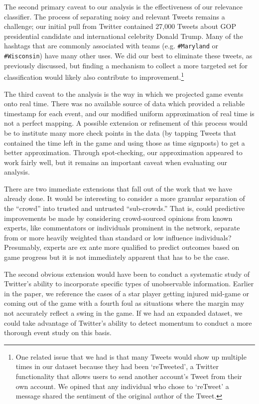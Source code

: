 \documentclass[12pt]{article}
\begin{document}
\begin{doublespacing}
The second primary caveat to our analysis is the effectiveness of our relevance classifier. The process of separating noisy and relevant Tweets remains a challenge; our initial pull from Twitter contained 27,000 Tweets about GOP presidential candidate and international celebrity Donald Trump. Many of the hashtags that are commonly associated with teams (e.g. \texttt{\#Maryland} or \texttt{\#Wisconsin}) have many other uses. We did our best to eliminate these tweets, as previously discussed, but finding a mechanism to collect a more targeted set for classification would likely also contribute to improvement.\footnote{One related issue that we had is that many Tweets would show up multiple times in our dataset because they had been `reTweeted', a Twitter functionality that allows users to send another account's Tweet from their own account. We opined that any individual who chose to `reTweet' a message shared the sentiment of the original author of the Tweet.} 

The third caveat to the analysis is the way in which we projected game events onto real time. There was no available source of data which provided a reliable timestamp for each event, and our modified uniform approximation of real time is not a perfect mapping. A possible extension or refinement of this process would be to institute many more check points in the data (by tapping Tweets that contained the time left in the game and using those as time signposts) to get a better approximation. Through spot-checking, our approximation appeared to work fairly well, but it remains an important caveat when evaluating our analysis. 

There are two immediate extensions that fall out of the work that we have already done. It would be interesting to consider a more granular separation of the ``crowd'' into trusted and untrusted ``sub-crowds.'' That is, could predictive improvements be made by considering crowd-sourced opinions from known experts, like commentators or individuals prominent in the network, separate from or more heavily weighted than standard or low influence individuals? Presumably, experts are ex ante more qualified to predict outcomes based on game progress but it is not immediately apparent that has to be the case.

The second obvious extension would have been to conduct a systematic study of Twitter's ability to incorporate specific types of unobservable information. Earlier in the paper, we reference the cases of a star player getting injured mid-game or coming out of the game with a fourth foul as situations where the margin may not accurately reflect a swing in the game. If we had an expanded dataset, we could take advantage of Twitter's ability to detect momentum to conduct a more thorough event study on this basis. 


\end{doublespacing}
\end{document}
